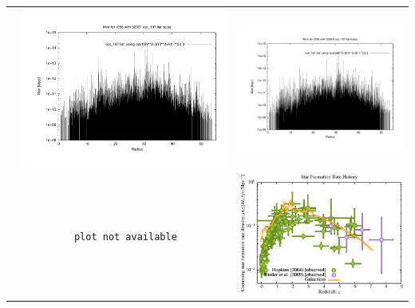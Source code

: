 \documentclass[a4paper,11pt,fleqn,oneside]{book}
\begin{document}
\begin{itemize}
\begin{table}[p]
\begin{tabular}{l|c|c}
 & \includegraphics[scale=0.25]{r256/h70/rst14lg3/plot_mvir_out_197.pdf} & \includegraphics[scale=0.25]{r256/h100/rst14lg3/plot_mvir_out_197.pdf} \\
 & \texttt{plot not available} & \includegraphics[scale=0.5]{r256/h100/rst14lg3/Plot_Star_Formation_History.pdf} \\

\end{tabular}
\end{table}
\end{itemize}
\end{document}
